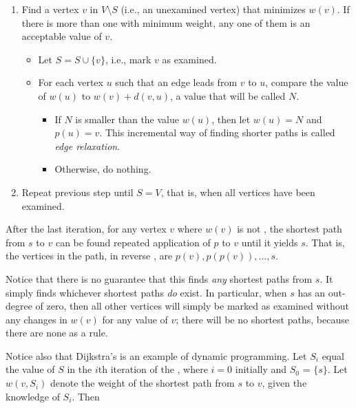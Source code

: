 \documentclass[12pt]{article}
\begin{document}
\begin{dijkstrasAlgorithm}
\begin{enumerate}
\item
Find a vertex $v$ in $V \setminus S$ (i.e., an unexamined vertex) that minimizes $w(v)$. If there is more than one with minimum weight, any one of them is an acceptable value of $v$.

\begin{itemize}
\item
Let $S = S \cup \{v\}$, i.e., mark $v$ as examined.

\item
For each vertex $u$ such that an edge leads from $v$ to $u$, compare the  value of $w(u)$ to $w(v) + d(v,u)$, a value that will be called $N$.

\begin{itemize}
\item
If $N$ is smaller than the  value $w(u)$, then let $w(u) = N$ and $p(u) = v$. This incremental way of finding shorter paths is called \emph{edge relaxation}.

\item
Otherwise, do nothing.
\end{itemize}
\end{itemize}

\item
Repeat previous step until $S = V$, that is, when all vertices have been examined.
\end{enumerate}

\end{dijkstrasAlgorithm}

After the last iteration, for any vertex $v$ where $w(v)$ is not , the shortest path from $s$ to $v$ can be found repeated application of $p$ to $v$ until it yields $s$. That is, the vertices in the path, in reverse , are $p(v), p(p(v)), \ldots, s$.

Notice that there is no guarantee that this  finds \emph{any} shortest paths from $s$. It simply finds whichever shortest paths \emph{do} exist. In particular, when $s$ has an out-degree of zero, then all other vertices will simply be marked as examined without any changes in $w(v)$ for any value of $v$; there will be no shortest paths, because there are none as a rule.

Notice also that Dijkstra's  is an example of dynamic programming. Let $S_i$ equal the value of $S$ in the $i$th iteration of the , where $i=0$ initially and $S_0$ = $\{s\}$. Let $w(v,S_i)$ denote the weight of the shortest path from $s$ to $v$, given the knowledge of $S_i$. Then
\end{document}
